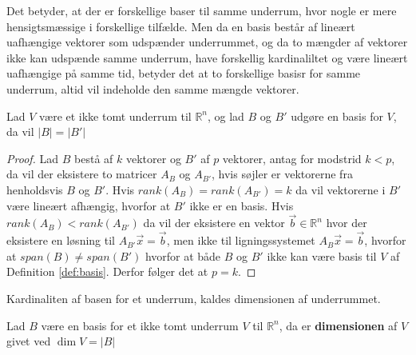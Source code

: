 Det betyder, at der er forskellige baser til samme underrum, hvor nogle er mere hensigtsmæssige i forskellige tilfælde.
Men da en basis består af lineært uafhængige vektorer som udspænder underrummet, og da to mængder af vektorer ikke kan udspænde samme underrum, have forskellig kardinaliltet og være lineært uafhængige på samme tid, betyder det at to forskellige basisr for samme underrum, altid vil indeholde den samme mængde vektorer.
\begin{stn}
Lad $V$ være et ikke tomt underrum til $\mathds{R}^n$, og lad $B$ og $B'$ udgøre en basis for $V$, da vil $|B|=|B'|$
\label{stn:basiskardinalitet}
\end{stn}
\begin{proof}
Lad $B$ bestå af $k$ vektorer og $B'$ af $p$ vektorer, antag for modstrid $k < p$, da vil der eksistere to matricer $A_{B}$ og $A_{B'}$, hvis søjler er vektorerne fra henholdsvis $B$ og $B'$.
Hvis $rank(A_{B}) = rank(A_{B'}) = k$ da vil vektorerne i $B'$ være lineært afhængig, hvorfor at $B'$ ikke er en basis.
Hvis $rank(A_{B}) < rank(A_{B'} )$ da vil der eksistere en vektor $\vec{b} \in \mathds{R}^n$ hvor der eksistere en løsning til $A_{B'}\vec{x} = \vec{b}$, men ikke til ligningssystemet $A_B \vec{x}=\vec{b}$, hvorfor at $span(B) \neq span(B')$ hvorfor at både $B$ og $B'$ ikke kan være basis til $V$ af Definition \ref{def:basis}.
Derfor følger det at $p=k$.
\end{proof}
Kardinaliten af basen for et underrum, kaldes dimensionen af underrummet.
\begin{defn}[Dimension]
Lad $B$ være en basis for et ikke tomt underrum $V$ til $\mathds{R}^n$, da er \textbf{dimensionen} af $V$ givet ved $\dim{V} = |B|$
\label{def:dim}
\end{defn}






